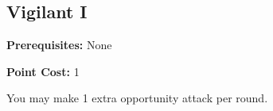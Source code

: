 \subsection*{Vigilant I}\label{feat:vigilant1}

\noindent
\textbf{Prerequisites:} None

\noindent
\textbf{Point Cost:} 1

You may make 1 extra opportunity attack per round.

